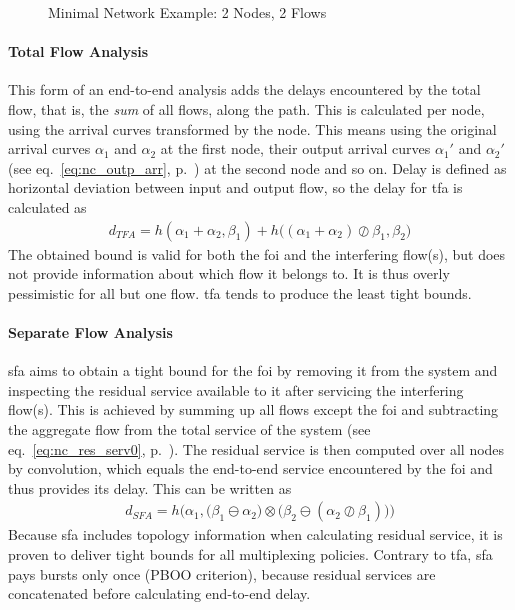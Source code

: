 \begin{figure}[H]
  \centering
  \def\svgwidth{0.6\textwidth}
  
  \caption{Minimal Network Example: 2 Nodes, 2 Flows}
  \label{fig:nc_basics_minnet}
\end{figure}


\paragraph{Total Flow Analysis}
This form of an end-to-end analysis adds the delays encountered by the total flow, that is, the \emph{sum} of all flows, along the path.
This is calculated per node, using the arrival curves transformed by the node. This means using the original arrival curves $\alpha_1$ and $\alpha_2$ at the first node, their output arrival curves
$\alpha_1'$ and $\alpha_2'$ (see eq.~\ref{eq:nc_outp_arr}, p.~\pageref{eq:nc_outp_arr}) at the second node and so on.
Delay is defined as horizontal deviation between input and output flow, so the delay for \gls{tfa} is calculated as
%
\begin{align}
d_{TFA} = h(\alpha_1 + \alpha_2, \beta_1) + h \big( (\alpha_1 + \alpha_2) \oslash \beta_1, \beta_2 \big)
\label{eq:d_tfa}
\end{align}
%
The obtained bound is valid for both the \gls{foi} and the interfering flow(s), but does not provide information about which flow it belongs to. It is thus overly pessimistic for all but one flow.
\gls{tfa} tends to produce the least tight bounds.

\paragraph{Separate Flow Analysis}
\gls{sfa} aims to obtain a tight bound for the \gls{foi} by removing it from the system and inspecting the residual service available to it after servicing the interfering flow(s).
This is achieved by summing up all flows except the \gls{foi} and subtracting
the aggregate flow from the total service of the system (see eq.~\ref{eq:nc_res_serv0}, p.~\pageref{eq:nc_res_serv0}). The residual service is then computed over all nodes by convolution,
which equals the end-to-end service encountered by the \gls{foi} and thus provides its delay. This can be written as
%
\begin{align}
d_{SFA} = h\Big(\alpha_1, \big(\beta_1 \ominus \alpha_2 \big) \otimes \big(\beta_2 \ominus (\alpha_2 \oslash \beta_1) \big) \Big)
\label{eq:d_sfa}
\end{align}
%
Because \gls{sfa} includes topology information when calculating residual service, it is proven to deliver tight bounds for all multiplexing policies. Contrary to \gls{tfa},  \gls{sfa} pays bursts only once (PBOO criterion), because residual services are concatenated
before calculating end-to-end delay.

